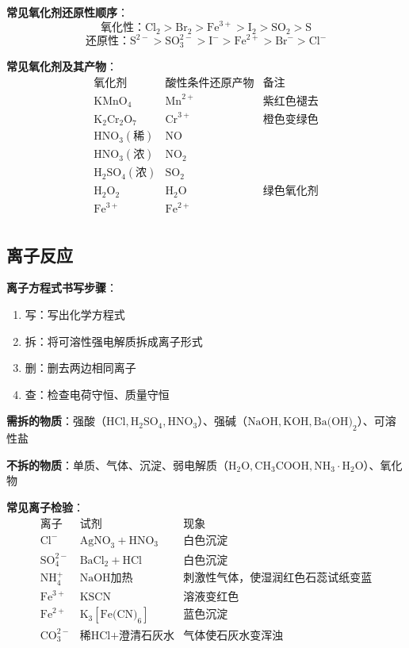 \textbf{常见氧化剂还原性顺序}：
\[
\text{氧化性}：\text{Cl}_2 > \text{Br}_2 > \text{Fe}^{3+} > \text{I}_2 > \text{SO}_2 > \text{S}
\]
\[
\text{还原性}：\text{S}^{2-} > \text{SO}_3^{2-} > \text{I}^- > \text{Fe}^{2+} > \text{Br}^- > \text{Cl}^-
\]

\textbf{常见氧化剂及其产物}：
\[
\begin{array}{c|c|c}
\text{氧化剂} & \text{酸性条件还原产物} & \text{备注} \\ \hline
\text{KMnO}_4 & \text{Mn}^{2+} & \text{紫红色褪去} \\
\text{K}_2\text{Cr}_2\text{O}_7 & \text{Cr}^{3+} & \text{橙色变绿色} \\
\text{HNO}_3(\text{稀}) & \text{NO} & \text{} \\
\text{HNO}_3(\text{浓}) & \text{NO}_2 & \text{} \\
\text{H}_2\text{SO}_4(\text{浓}) & \text{SO}_2 & \text{} \\
\text{H}_2\text{O}_2 & \text{H}_2\text{O} & \text{绿色氧化剂} \\
\text{Fe}^{3+} & \text{Fe}^{2+} & \text{} \\
\end{array}
\]

\subsection{离子反应}

\textbf{离子方程式书写步骤}：
\begin{enumerate}
  \item 写：写出化学方程式
  \item 拆：将可溶性强电解质拆成离子形式
  \item 删：删去两边相同离子
  \item 查：检查电荷守恒、质量守恒
\end{enumerate}

\textbf{需拆的物质}：强酸（$\text{HCl},\text{H}_2\text{SO}_4,\text{HNO}_3$）、强碱（$\text{NaOH},\text{KOH},\text{Ba(OH)}_2$）、可溶性盐

\textbf{不拆的物质}：单质、气体、沉淀、弱电解质（$\text{H}_2\text{O},\text{CH}_3\text{COOH},\text{NH}_3\cdot\text{H}_2\text{O}$）、氧化物

\textbf{常见离子检验}：
\[
\begin{array}{c|c|c}
\text{离子} & \text{试剂} & \text{现象} \\ \hline
\text{Cl}^- & \text{AgNO}_3+\text{HNO}_3 & \text{白色沉淀} \\
\text{SO}_4^{2-} & \text{BaCl}_2+\text{HCl} & \text{白色沉淀} \\
\text{NH}_4^+ & \text{NaOH}加热 & \text{刺激性气体，使湿润红色石蕊试纸变蓝} \\
\text{Fe}^{3+} & \text{KSCN} & \text{溶液变红色} \\
\text{Fe}^{2+} & \text{K}_3[\text{Fe(CN)}_6] & \text{蓝色沉淀} \\
\text{CO}_3^{2-} & \text{稀HCl}+\text{澄清石灰水} & \text{气体使石灰水变浑浊} \\
\end{array}
\]


